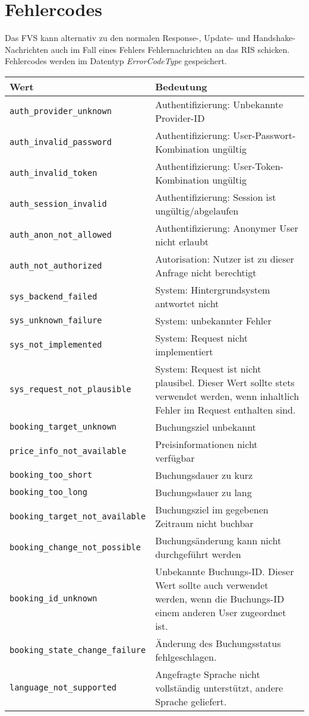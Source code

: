 \section{Fehlercodes}
\label{sec:CodeTabellen:ErrorCode}
Das FVS kann alternativ zu den normalen Response-, Update- und Handshake-Nachrichten auch im Fall eines Fehlers Fehlernachrichten an das RIS schicken. Fehlercodes werden im Datentyp \emph{ErrorCodeType} gespeichert.
\begin{flushleft}
\begin{tabularx}{\linewidth}{l>{\raggedright\arraybackslash}X}
\toprule
Wert & Bedeutung\\
\midrule
\verb|auth_provider_unknown| & Authentifizierung: Unbekannte Provider-ID\\
\verb|auth_invalid_password| & Authentifizierung: User-Passwort-Kombination ungültig\\
\verb|auth_invalid_token| & Authentifizierung: User-Token-Kombination ungültig\\
\verb|auth_session_invalid| & Authentifizierung: Session ist ungültig/abgelaufen\\
\verb|auth_anon_not_allowed| & Authentifizierung: Anonymer User nicht erlaubt\\
\verb|auth_not_authorized| & Autorisation: Nutzer ist zu dieser Anfrage nicht berechtigt\\
\verb|sys_backend_failed| & System: Hintergrundsystem antwortet nicht\\
\verb|sys_unknown_failure| & System: unbekannter Fehler\\
\verb|sys_not_implemented| & System: Request nicht implementiert\\
\verb|sys_request_not_plausible| & System: Request ist nicht plausibel. Dieser Wert sollte stets verwendet werden, wenn inhaltlich Fehler im Request enthalten sind.\\
\verb|booking_target_unknown| & Buchungsziel unbekannt\\
\verb|price_info_not_available| & Preisinformationen nicht verfügbar\\
\verb|booking_too_short| & Buchungsdauer zu kurz\\
\verb|booking_too_long| & Buchungsdauer zu lang\\
\verb|booking_target_not_available| & Buchungsziel im gegebenen Zeitraum nicht buchbar\\
\verb|booking_change_not_possible| & Buchungsänderung kann nicht durchgeführt werden\\
\verb|booking_id_unknown| & Unbekannte Buchungs-ID. Dieser Wert sollte auch verwendet werden, wenn die Buchungs-ID einem anderen User zugeordnet ist.\\
\verb|booking_state_change_failure| & Änderung des Buchungsstatus fehlgeschlagen.\\
\verb|language_not_supported| & Angefragte Sprache nicht vollständig unterstützt, andere Sprache geliefert.\\
\bottomrule
\end{tabularx}
\end{flushleft}
